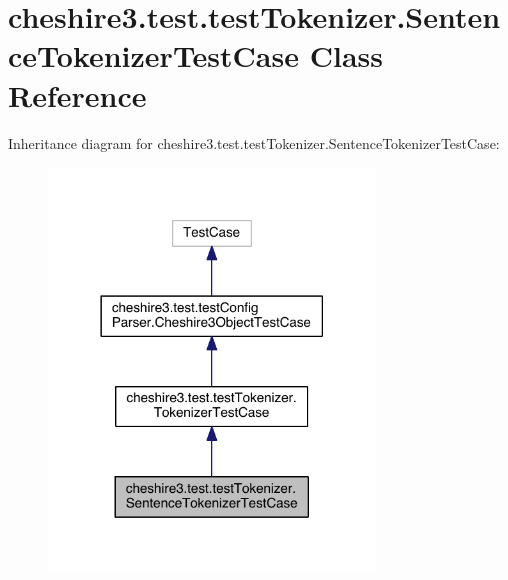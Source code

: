 \hypertarget{classcheshire3_1_1test_1_1test_tokenizer_1_1_sentence_tokenizer_test_case}{\section{cheshire3.\-test.\-test\-Tokenizer.\-Sentence\-Tokenizer\-Test\-Case Class Reference}
\label{classcheshire3_1_1test_1_1test_tokenizer_1_1_sentence_tokenizer_test_case}
}


Inheritance diagram for cheshire3.\-test.\-test\-Tokenizer.\-Sentence\-Tokenizer\-Test\-Case\-:
\nopagebreak
\begin{figure}[H]
\begin{center}
\leavevmode
\includegraphics[width=246pt]{classcheshire3_1_1test_1_1test_tokenizer_1_1_sentence_tokenizer_test_case__inherit__graph}
\end{center}
\end{figure}


